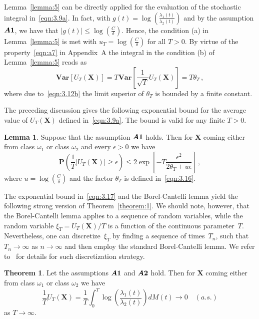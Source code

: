 \documentclass[lettersize,journal,onecolumn]{IEEEtran}
\theoremstyle{definition}
\newtheorem{theorem}{Theorem}
\newtheorem{lemma}{Lemma}
\newcommand{\Var}[1]{\mathbf{Var}\left[#1\right]}
\newcommand{\assumption}[1]{{\rm \boldsymbol{A#1}}}
\begin{document}
Lemma~\ref{lemma:5} can be directly applied for the evaluation of the stochastic 
integral in~\eqref{eqn:3.9a}. In fact, with \mbox{$
	g(t) = \log\left(\frac{\lambda_{1}(t)}{\lambda_{2}(t)}\right)
	$} and by the assumption $\assumption{1}$, we have that \mbox{$
	|g(t)| \leq \log\left(\frac{C}{\delta}\right)
	$}. Hence, the condition (a) in Lemma~\ref{lemma:5} is met with 
$u_{T}=\log\left(\frac{C}{\delta}\right)$ for all $T>0$. By virtue of the 
property~\eqref{eqn:a7} in  Appendix~A the integral in the condition (b) of
Lemma~\ref{lemma:5} reads as
\begin{equation}
	\Var{U_{T}(\mathbf{X})} =
	T \Var{\frac{1}{\sqrt{T}}U_{T}(\mathbf{X})} =
	T\theta_{T}
	\label{eqn:3.16}\,,
\end{equation}
where due to~\eqref{eqn:3.12b} the limit superior of $\theta_T$ is bounded by a finite
constant.

The preceding discussion gives the following exponential bound for the average value of
$U_{T}(\mathbf{X})$ defined in~\eqref{eqn:3.9a}. The bound is valid for any finite 
$T > 0$.
\begin{lemma}
	\label{lemma:6}
	Suppose that the assumption $\assumption{1}$ holds. Then for $\mathbf{X}$ coming 
	either from class $\omega_{1}$ or class $\omega_{2}$ and every $\epsilon>0$ we have
	\begin{equation}
		\mathbf{P}\left(
		\frac{1}{T}\left|U_{T}(\mathbf{X})\right| \geq \epsilon
		\right) \leq
		2 \exp\left[
		-T\frac{\epsilon^2}{2\theta_{T}+u\epsilon}
		\right]
		\label{eqn:3.17}\,,
	\end{equation}
	where $u=\log\left(\frac{C}{\delta}\right)$ and the factor $\theta_{T}$ is defined 
	in~\eqref{eqn:3.16}.
\end{lemma}
The exponential bound  in~\eqref{eqn:3.17} and the Borel-Cantelli lemma yield the
following strong version of Theorem~\ref{theorem:1}. We should note, however,
that the Borel-Cantelli lemma applies to a sequence of random variables, while the
random variable $\xi_T = U_{T}(\mathbf{X})/T$ is a function of the continuous
parameter~$T$. Nevertheless, one can discretize~$\xi_T$ by finding a sequence of
times~$T_n$, such that $T_n \to \infty$ as $n \to \infty$ and then employ the standard
Borel-Cantelli lemma. We refer to~\cite{vere1982estimation} for details for such
discretization strategy.
\begin{theorem}
	\label{theorem:2}
	Let the assumptions $\assumption{1}$ and $\assumption{2}$ hold. 
	Then for $\mathbf{X}$ coming either from 
	class $\omega_{1}$ or class $\omega_{2}$ we have
	\begin{equation}
		\frac{1}{T}U_{T}(\mathbf{X}) =
		\frac{1}{T} \int_{0}^{T} \log\left(
		\frac{\lambda_{1}(t)}{\lambda_{2}(t)}
		\right) dM(t) \to 0
		\enspace\enspace
		(a.s.)
		\label{eqn:3.18}
	\end{equation}
	as $T\to\infty$.
\end{theorem}
\end{document}
